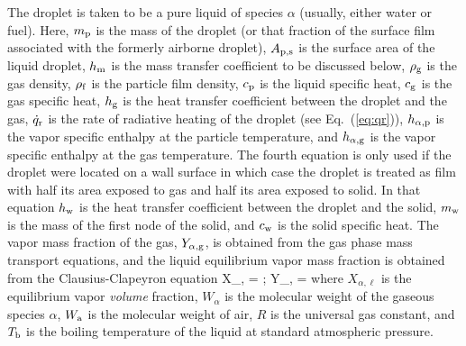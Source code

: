 The droplet is taken to be a pure liquid of species $\alpha$ (usually, either water or fuel).  Here, $m_{\rm p}$ is the mass of the droplet (or that fraction of the surface film associated with the formerly airborne droplet), $A_{\rm p,s}$ is the surface area of the liquid droplet, $h_{\rm m}$ is the mass transfer coefficient to be discussed below, $\rho_{\rm g}$ is the gas density, $\rho_{\rm f}$ is the particle film density, $c_{\rm p}$ is the liquid specific heat, $c_{\rm g}$ is the gas specific heat, $h_{\rm g}$ is the heat transfer coefficient between the droplet and the gas, $\dot{q}_{\rm r}$ is the rate of radiative heating of the droplet (see Eq.~(\ref{eq:qr})), $h_{\rm \alpha,p}$ is the vapor specific enthalpy at the particle temperature, and $h_{\rm \alpha,g}$ is the vapor specific enthalpy at the gas temperature. The fourth equation is only used if the droplet were located on a wall surface in which case the droplet is treated as film with half its area exposed to gas and half its area exposed to solid. In that equation $h_{\rm w}$ is the heat transfer coefficient between the droplet and the solid, $m_{\rm w}$ is the mass of the first node of the solid, and $c_{\rm w}$ is the solid specific heat. The vapor mass fraction of the gas, $Y_{\rm \alpha,g}$, is obtained from the gas phase mass transport equations, and the liquid equilibrium vapor mass fraction is obtained from the Clausius-Clapeyron equation
\be X_{\rm \alpha,\ell} = \exp {}  \quad ; \quad
      Y_{\rm \alpha,\ell} =   \label{clausius_clapeyron} \ee
where $X_{\alpha,\ell}$ is the equilibrium vapor {\em volume} fraction, $W_{\alpha}$ is the molecular weight of the gaseous species $\alpha$, $W_{\rm a}$ is the molecular weight of air, $R$ is the universal gas constant, and $T_{\rm b}$ is the boiling temperature of the liquid at standard atmospheric pressure.

